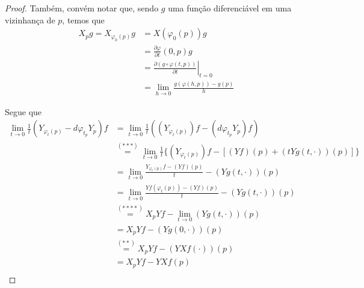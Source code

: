 \begin{proposition}
\begin{proof}
        Também, convém notar que, sendo $g$ uma função diferenciável em uma vizinhança de $p$, temos que
        \begin{align*}
            X_{p}g=X_{\varphi_{0}(p)}g & = X(\varphi_{0}(p))g                                                      \\
                                       & =\frac{\partial \varphi}{\partial t}(0, p)g                               \\
                                       & = \left.\frac{\partial (g \circ  \varphi(t, p))}{\partial t}\right|_{t=0} \\
                                       & =\lim_{ h \to 0 } \frac{g(\varphi(h, p))-g(p)}{h} \tag{$****$}
        \end{align*}

        Segue que
        \begin{align*}
            \lim_{ t \to 0 } \frac{1}{t}(Y_{\varphi_{t}(p)}-d\varphi_{t_{p}}Y_{p})f & = \lim_{ t \to 0 } \frac{1}{t}((Y_{\varphi_{t}(p)})f-(d\varphi_{t_{p}}Y_{p})f)                         \\
                                                                                    & \overset{(***)}{=} \lim_{ t \to 0 } \frac{1}{t}\{(Y_{\varphi_{t}(p)})f-[(Yf)(p)+(tYg(t, \cdot))(p) ]\} \\
                                                                                    & =\lim_{ t \to 0 } \frac{Y_{\varphi_{t}(p)}f - (Yf)(p)}{t} - (Yg(t, \cdot))(p)                          \\
                                                                                    & =\lim_{ t \to 0 } \frac{Yf({\varphi_{t}(p)}) - (Yf)(p)}{t} - (Yg(t, \cdot))(p)                         \\
                                                                                    & \overset{(****)}{=}X_{p}Yf - \lim_{ t \to 0 } (Yg(t, \cdot))(p)                                        \\
                                                                                    & =X_{p}Yf - (Yg(0, \cdot))(p)                                                                           \\
                                                                                    & \overset{(**)}{=}X_{p}Yf - (YXf(\cdot))(p)                                                             \\
                                                                                    & =X_{p}Yf - YXf(p)                                                                                      \\

\end{align*}
\end{proof}
\end{proposition}
